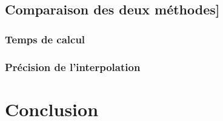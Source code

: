 \documentclass[a4paper,9pt]{article}
\begin{document}
\subsection{Comparaison des deux méthodes]}
\label{subsec:comparaison_methodes}

\subsubsection{Temps de calcul}
\label{subsec:temps_calcul}

\subsubsection{Précision de l'interpolation}
\label{subsec:precision_interpolation}

\section{Conclusion}
\label{sec:conclusion}
\end{document}
